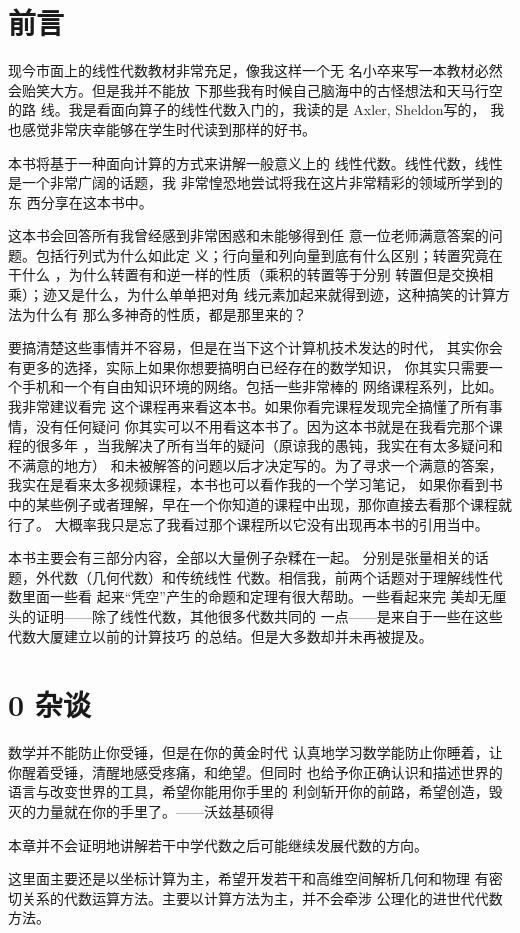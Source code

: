 \documentclass{book}
\renewcommand{\contentsname}{Table of Contents} %
\newcommand{\prefacePara}
{
现今市面上的线性代数教材非常充足，像我这样一个无
名小卒来写一本教材必然会贻笑大方。但是我并不能放
下那些我有时候自己脑海中的古怪想法和天马行空的路
线。我是看面向算子的线性代数入门的，我读的是
Axler, Sheldon写的\cite[Linear algebra done right]{1664}，
我也感觉非常庆幸能够在学生时代读到那样的好书。

本书将基于一种面向计算的方式来讲解一般意义上的
线性代数。线性代数，线性是一个非常广阔的话题，我
非常惶恐地尝试将我在这片非常精彩的领域所学到的东
西分享在这本书中。

这本书会回答所有我曾经感到非常困惑和未能够得到任
意一位老师满意答案的问题。包括行列式为什么如此定
义；行向量和列向量到底有什么区别；转置究竟在干什么
，为什么转置有和逆一样的性质（乘积的转置等于分别
转置但是交换相乘）；迹又是什么，为什么单单把对角
线元素加起来就得到迹，这种搞笑的计算方法为什么有
那么多神奇的性质，都是那里来的？

要搞清楚这些事情并不容易，但是在当下这个计算机技术发达的时代，
其实你会有更多的选择，实际上如果你想要搞明白已经存在的数学知识，
你其实只需要一个手机和一个有自由知识环境的网络。包括一些非常棒的
网络课程系列，比如\cite[线性代数的本质]{citee}。我非常建议看完
这个课程再来看这本书。如果你看完课程发现完全搞懂了所有事情，没有任何疑问
你其实可以不用看这本书了。因为这本书就是在我看完那个课程的很多年
，当我解决了所有当年的疑问（原谅我的愚钝，我实在有太多疑问和不满意的地方）
和未被解答的问题以后才决定写的。为了寻求一个满意的答案，
我实在是看来太多视频课程，本书也可以看作我的一个学习笔记，
如果你看到书中的某些例子或者理解，早在一个你知道的课程中出现，那你直接去看那个课程就行了。
大概率我只是忘了我看过那个课程所以它没有出现再本书的引用当中。

本书主要会有三部分内容，全部以大量例子杂糅在一起。
分别是张量相关的话题，外代数（几何代数）和传统线性
代数。相信我，前两个话题对于理解线性代数里面一些看
起来“凭空”产生的命题和定理有很大帮助。一些看起来完
美却无厘头的证明——除了线性代数，其他很多代数共同的
一点——是来自于一些在这些代数大厦建立以前的计算技巧
的总结。但是大多数却并未再被提及。


}
\begin{document}
\begin{CJK}{UTF8}{gbsn}
    \addtocounter{page}{2}

    \chapter{前言}
    \prefacePara{}

    \setcounter{tocdepth}{3}
    \renewcommand{\contentsname}{目录}
    \tableofcontents

    \mainmatter

    \chapter{0 杂谈}



    数学并不能防止你受锤，但是在你的黄金时代
    认真地学习数学能防止你睡着，让你醒着受锤，清醒地感受疼痛，和绝望。但同时
    也给予你正确认识和描述世界的语言与改变世界的工具，希望你能用你手里的
    利剑斩开你的前路，希望创造，毁灭的力量就在你的手里了。——沃兹基硕得

    本章并不会证明地讲解若干中学代数之后可能继续发展代数的方向。

    这里面主要还是以坐标计算为主，希望开发若干和高维空间解析几何和物理
    有密切关系的代数运算方法。主要以计算方法为主，并不会牵涉
    公理化的进世代代数方法。


\end{CJK}
\end{document}
